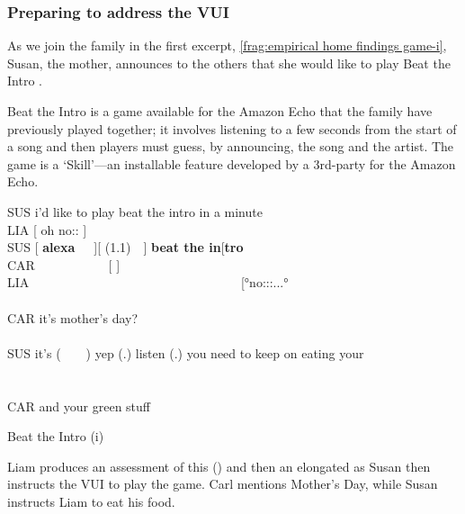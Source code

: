 


\subsubsection{Preparing to address the VUI}\label{sec:empirical home findings game preinit}
As we join the family in the first excerpt, \autoref{frag:empirical home findings game-i}, Susan, the mother, announces to the others that she would like to play Beat the Intro .

Beat the Intro is a game available for the Amazon Echo that the family have previously played together; it involves listening to a few seconds from the start of a song and then players must guess, by announcing, the song and the artist.
The game is a `Skill'---an installable feature developed by a 3rd-party for the Amazon Echo.

\begin{inlinefrag}
    \begin{transcript}
        \by SUS {i'd like to play beat the intro in a minute} \\
        \by LIA {[ oh no:: ]} \\
        \by SUS {[ \textbf{alexa}~~~][ (1.1)~~] \textbf{beat the in}[\textbf{tro}} \\
        \by CAR {~~~~~~~~~~~[  ] } \\
        \by LIA {~~~~~~~~~~~~~~~~~~~~~~~~~~~~~~~~~[°no:::...°} \\
         \\
        \by CAR {it's mother's day?} \\
         \\
        \by SUS {it's (~~~~) yep (.) listen (.) you need to keep on eating your} \\
         \\
         \\
        \by CAR {and your green stuff} \\
    \end{transcript}
    \caption{Beat the Intro (i)}\label{frag:empirical home findings game-i}
\end{inlinefrag}

Liam produces an assessment of this () and then an elongated  as Susan then instructs the \ac{VUI} to play the game.
Carl mentions Mother's Day, while Susan instructs Liam to eat his food.

